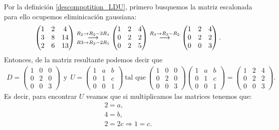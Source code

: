 \documentclass[11pt,letterpaper]{article}
\newcommand{\grstep}[2][\relax]{%
   \ensuremath{\mathrel{
       {\mathop{\longrightarrow}\limits^{#2\mathstrut}_{
                                     \begin{subarray}{l} #1 \end{subarray}}}}}}
\begin{document}
\begin{enumerate}
Por la definición \ref{descompotition_LDU}, primero busquemos la matriz escalonada para ello ocupemos eliminicación gaussiana:
\begin{align*}
\begin{pmatrix}
1 & 2 & 4\\
3 & 8 & 14\\
2 & 6 & 13
\end{pmatrix}%
\grstep[R3 \rightarrow R_3-2R_1]{R_2 \rightarrow R_2-3R_1}
%
\begin{pmatrix}
1 & 2 & 4\\
0 & 2 & 2\\
0 & 2 & 5
\end{pmatrix}%
\grstep[]{R_3 \rightarrow R_3-R_2}
%
\begin{pmatrix}
1 & 2 & 4\\
0 & 2 & 2\\
0 & 0 & 3
\end{pmatrix}.
\end{align*}
Entonces, de la matriz resultante podemos decir que
\begin{align*}
D=\begin{pmatrix}
1 & 0 & 0\\
0 & 2 & 0\\
0 & 0 & 3
\end{pmatrix}\ \ \text{y} \ \ U=\begin{pmatrix}
1 & a & b\\
0 & 1 & c\\
0 & 0 & 1
\end{pmatrix}\ \text{tal que}\ \begin{pmatrix}
1 & 0 & 0\\
0 & 2 & 0\\
0 & 0 & 3
\end{pmatrix}\begin{pmatrix}
1 & a & b\\
0 & 1 & c\\
0 & 0 & 1
\end{pmatrix}=\begin{pmatrix}
1 & 2 & 4\\
0 & 2 & 2\\
0 & 0 & 3
\end{pmatrix}.
\end{align*}
Es decir, para encontrar $U$ veamos que si multiplicamos las matrices tenemos que:
\begin{align*}
2=a, \\
4=b,\\
2=2c \Rightarrow 1=c.
\end{align*}

\end{enumerate}
\end{document}
